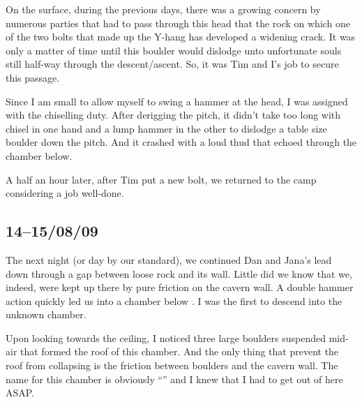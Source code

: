 On the surface, during the previous days, there was a growing concern by
numerous parties that had to pass through this head that the rock on
which one of the two bolts that made up the Y-hang has developed a
widening crack. It was only a matter of time until this boulder would
dislodge unto unfortunate souls still half-way through the
descent/ascent. So, it was Tim and I's job to secure this passage.

Since I am small to allow myself to swing a hammer at the head, I was
assigned with the chiselling duty. After derigging the pitch, it didn't
take too long with chisel in one hand and a lump hammer in the other to
dislodge a table size boulder down the pitch. And it crashed with a loud
thud that echoed through the chamber below.

A half an hour later, after Tim put a new bolt, we returned to the camp
considering a job well-done.



\subsection{14--15/08/09}


The next night (or day by our standard), we continued Dan and Jana's
lead down  through a gap between loose rock and its
wall. Little did we know that we, indeed, were kept up there by pure
friction on the cavern wall. A double hammer action quickly led us into
a chamber below . I was the first to descend into the
unknown chamber.

Upon looking towards the ceiling, I noticed three large boulders
suspended mid-air that formed the roof of this chamber. And the only
thing that prevent the roof from collapsing is the friction between
boulders and the cavern wall. The name for this chamber is obviously
``'' and I knew that I had to get out of here ASAP.


